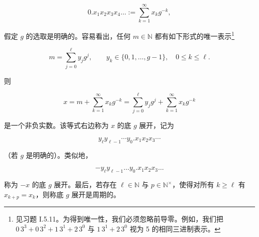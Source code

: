 \[
0.x_{1}x_{2}x_{3}x_{4}\ldots:=\sum_{k=1}^{\infty}x_{k}g^{-k},
\]

假定 $g$ 的选取是明确的。容易看出，任何 $m \in \mathbb{N}$ 都有如下形式的唯一表示\footnote{见习题 I.5.11。为得到唯一性，我们必须忽略前导零。例如，我们把 $0\,3^3+0\,3^2+1\,3^1+2\,3^0$ 与 $1\,3^1+2\,3^0$ 视为 5 的相同三进制表示。}

\begin{equation}
m=\sum_{j=0}^{\ell}y_{j}g^{j},\qquad y_{k}\in\{0,1,\ldots,g-1\},\quad0\leq k\leq\ell.
\end{equation}

则

\[
x=m+\sum_{k=1}^{\infty}x_{k}g^{-k}=\sum_{j=0}^{\ell}y_{j}g^{j}+\sum_{k=1}^{\infty}x_{k}g^{-k}
\]

是一个非负实数。该等式右边称为 $x$ 的底 $ g $ 展开，记为

\[
y_{\ell}y_{\ell-1}\cdots y_{0}.x_{1}x_{2}x_{3}\cdots
\]

（若 $g$ 是明确的）。类似地，

\[
-y_{\ell}y_{\ell-1}\ldots y_{0}.x_{1}x_{2}x_{3}\ldots
\]

称为 $-x$ 的底 $g$ 展开。最后，若存在 $\ell \in \mathbb{N}$ 与 $p \in \mathbb{N}^\times$，使得对所有 $k \geq \ell$ 有 $x_{k+p} = x_k$，则称底 $g$ 展开是周期的。

